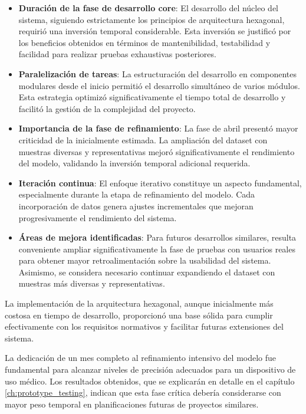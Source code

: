 \begin{itemize}
    \item \textbf{Duración de la fase de desarrollo core}: El desarrollo del núcleo del sistema, siguiendo estrictamente los principios de arquitectura hexagonal, requirió una inversión temporal considerable. Esta inversión se justificó por los beneficios obtenidos en términos de mantenibilidad, testabilidad y facilidad para realizar pruebas exhaustivas posteriores.
    
    \item \textbf{Paralelización de tareas}: La estructuración del desarrollo en componentes modulares desde el inicio permitió el desarrollo simultáneo de varios módulos. Esta estrategia optimizó significativamente el tiempo total de desarrollo y facilitó la gestión de la complejidad del proyecto.
    
    \item \textbf{Importancia de la fase de refinamiento}: La fase de abril presentó mayor criticidad de la inicialmente estimada. La ampliación del dataset con muestras diversas y representativas mejoró significativamente el rendimiento del modelo, validando la inversión temporal adicional requerida.
    
    \item \textbf{Iteración continua}: El enfoque iterativo constituye un aspecto fundamental, especialmente durante la etapa de refinamiento del modelo. Cada incorporación de datos genera ajustes incrementales que mejoran progresivamente el rendimiento del sistema.
    
    \item \textbf{Áreas de mejora identificadas}: Para futuros desarrollos similares, resulta conveniente ampliar significativamente la fase de pruebas con usuarios reales para obtener mayor retroalimentación sobre la usabilidad del sistema. Asimismo, se considera necesario continuar expandiendo el dataset con muestras más diversas y representativas.
\end{itemize}

La implementación de la arquitectura hexagonal, aunque inicialmente más costosa en tiempo de desarrollo, proporcionó una base sólida para cumplir efectivamente con los requisitos normativos y facilitar futuras extensiones del sistema.

La dedicación de un mes completo al refinamiento intensivo del modelo fue fundamental para alcanzar niveles de precisión adecuados para un dispositivo de uso médico. Los resultados obtenidos, que se explicarán en detalle en el capítulo \ref{ch:prototype_testing}, indican que esta fase crítica debería considerarse con mayor peso temporal en planificaciones futuras de proyectos similares.
